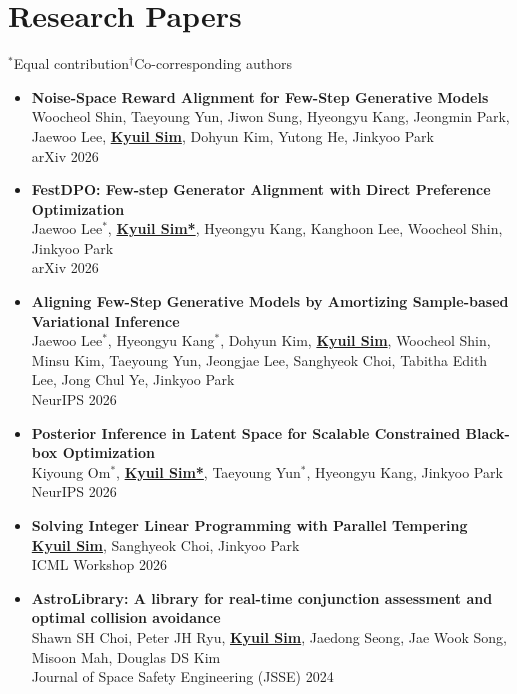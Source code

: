 \documentclass[11pt,a4paper]{moderncv}
\newenvironment{publist}%
  {\begin{itemize}[leftmargin=21.9pt, labelsep=5pt, align=right,
                   topsep=5.1pt, itemsep=5.1pt, parsep=0pt, partopsep=0pt]\small}%
  {\end{itemize}}
\newcommand{\pub}[4]{%
  \item[{[#1]}] \textbf{#2}\\ #3\\ #4}
\newcommand*{\me}{\textbf{\underline{Kyuil Sim}}}
\newcommand*{\meeq}{\textbf{\underline{Kyuil Sim*}}}
\begin{document}
\section{Research Papers}
{\small $^*$Equal contribution\quad $^\dagger$Co-corresponding authors\par}
\vspace{2.8pt}

\begin{publist}
  \pub{P2}{Noise-Space Reward Alignment for Few-Step Generative Models}
      {Woocheol Shin, Taeyoung Yun, Jiwon Sung, Hyeongyu Kang, Jeongmin Park, Jaewoo Lee, \me,
       Dohyun Kim, Yutong He, Jinkyoo Park}
      {arXiv 2026}
  \pub{P1}{FestDPO: Few-step Generator Alignment with Direct Preference Optimization}
      {Jaewoo Lee$^*$, \meeq, Hyeongyu Kang, Kanghoon Lee, Woocheol Shin, Jinkyoo Park}
      {arXiv 2026}
\end{publist}

\begin{publist}
  \pub{C2}{Aligning Few-Step Generative Models by Amortizing Sample-based Variational Inference}
      {Jaewoo Lee$^*$, Hyeongyu Kang$^*$, Dohyun Kim, \me, Woocheol Shin, Minsu Kim, Taeyoung Yun,
       Jeongjae Lee, Sanghyeok Choi, Tabitha Edith Lee, Jong Chul Ye, Jinkyoo Park}
      {NeurIPS 2026}
  \pub{C1}{Posterior Inference in Latent Space for Scalable Constrained Black-box Optimization}
      {Kiyoung Om$^*$, \meeq, Taeyoung Yun$^*$, Hyeongyu Kang, Jinkyoo Park}
      {NeurIPS 2026}
\end{publist}
\begin{publist}
  \pub{W1}{Solving Integer Linear Programming with Parallel Tempering}
      {\me, Sanghyeok Choi, Jinkyoo Park}
      {ICML Workshop 2026}
\end{publist}
\begin{publist}
  \pub{J1}{AstroLibrary: A library for real-time conjunction assessment and optimal collision avoidance}
      {Shawn SH Choi, Peter JH Ryu, \me, Jaedong Seong, Jae Wook Song, Misoon Mah, Douglas DS Kim}
      {Journal of Space Safety Engineering (JSSE) 2024}
\end{publist}
\end{document}
